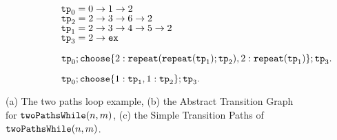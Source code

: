 {\begin{figure}
\begin{subfigure}{.71\textwidth}
{\small
\begin{subfigure}{.3\textwidth}
\begin{centering}
    $\mathtt{tp}_0 = 0 \to 1 \to 2$ \\
    $\mathtt{tp}_2 = 2 \to 3 \to 6 \to 2$ \\ 
    $\mathtt{tp}_1 = 2 \to 3 \to 4 \to 5 \to 2$ \\
    $\mathtt{tp}_3 = 2 \to \mathtt{ex}$
    \caption{}
\end{centering}
\end{subfigure}
}
{\small
\begin{subfigure}{.8\textwidth}
\begin{centering}
$
\tpath_0 ; 
\rpchoose{2: \rprepeat(\rprepeat(\tpath_1); \tpath_2), 
2: \rprepeat(\tpath_1)}; \tpath_3.
$
\end{centering}
\end{subfigure}
}
{\small
\begin{subfigure}{.8\textwidth}
\begin{centering}
$
\tpath_0; 
\rpchoose{ 1: \tpath_1, 1: \tpath_2 }; \tpath_3.
$
\end{centering}
\end{subfigure}
}
\end{subfigure}
\vspace{-0.2cm}
\caption{
(a) The two paths loop example,
(b) the Abstract Transition Graph for $\mathtt{twoPathsWhile}(n, m)$,
(c) the Simple Transition Paths of $\mathtt{twoPathsWhile}(n, m)$.}
\vspace{-0.5cm}
    \label{fig:whileTwoCounters-overview}
\end{figure}
}


